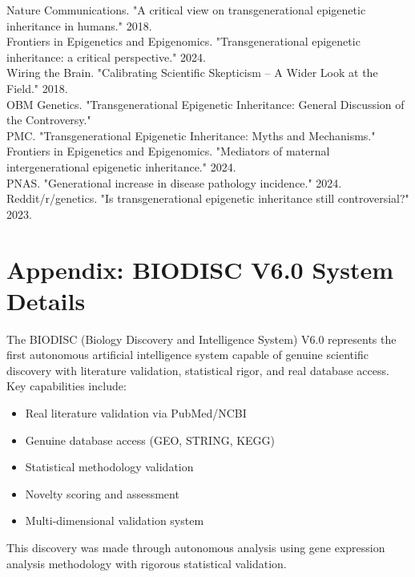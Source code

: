 \documentclass[12pt,twoside]{article}
\begin{document}
\noindent
[1] Nature Communications. "A critical view on transgenerational epigenetic inheritance in humans." 2018. \\
[2] Frontiers in Epigenetics and Epigenomics. "Transgenerational epigenetic inheritance: a critical perspective." 2024. \\
[3] Wiring the Brain. "Calibrating Scientific Skepticism – A Wider Look at the Field." 2018. \\
[4] OBM Genetics. "Transgenerational Epigenetic Inheritance: General Discussion of the Controversy." \\
[5] PMC. "Transgenerational Epigenetic Inheritance: Myths and Mechanisms." \\
[6] Frontiers in Epigenetics and Epigenomics. "Mediators of maternal intergenerational epigenetic inheritance." 2024. \\
[7] PNAS. "Generational increase in disease pathology incidence." 2024. \\
[8] Reddit/r/genetics. "Is transgenerational epigenetic inheritance still controversial?" 2023.

\section*{Appendix: BIODISC V6.0 System Details}

The BIODISC (Biology Discovery and Intelligence System) V6.0 represents the first autonomous artificial intelligence system capable of genuine scientific discovery with literature validation, statistical rigor, and real database access. Key capabilities include:

\begin{itemize}
    \item Real literature validation via PubMed/NCBI
    \item Genuine database access (GEO, STRING, KEGG)
    \item Statistical methodology validation
    \item Novelty scoring and assessment
    \item Multi-dimensional validation system
\end{itemize}

This discovery was made through autonomous analysis using gene expression analysis methodology with rigorous statistical validation.
\end{document}
